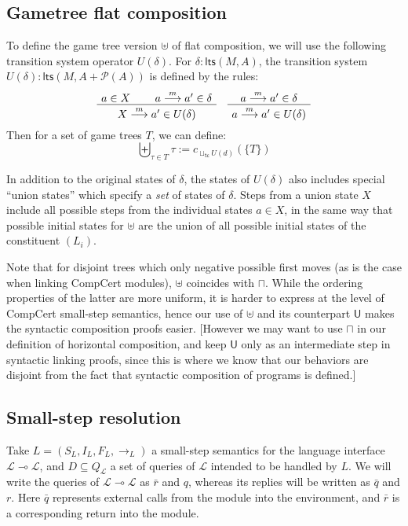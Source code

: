 \documentclass[11pt]{article}
\newcommand{\kw}[1]{{\mathsf{#1}}}
\begin{document}
\subsection{Gametree flat composition}

To define the game tree version $\uplus$ of flat composition,
we will use the following transition system operator $U(\delta)$.
For $\delta : \kw{lts}(M, A)$,
the transition system $U(\delta) : \kw{lts}(M, A + \mathcal{P}(A))$
is defined by the rules:
\[
  \AxiomC{$a \in X$}
  \AxiomC{$a \stackrel{m}{\longrightarrow} a' \in \delta$}
  \BinaryInfC{$X \stackrel{m}{\longrightarrow} a' \in U(\delta)$}
  \DisplayProof
  \quad
  \AxiomC{$a \stackrel{m}{\longrightarrow} a' \in \delta$}
  \UnaryInfC{$a \stackrel{m}{\longrightarrow} a' \in U(\delta)$}
  \DisplayProof
\]
Then for a set of game trees $T$,
we can define:
\[
  \biguplus_{\tau \in T} \tau := c_{\sqcup_\kw{tc} U(d)}(\{ T \})
\]

In addition to the original states of $\delta$,
the states of $U(\delta)$ also includes special ``union states''
which specify a \emph{set} of states of $\delta$.
Steps from a union state $X$ include all possible steps
from the individual states $a \in X$,
in the same way that possible initial states for $\uplus$
are the union of all possible initial states of the constituent $(L_i)$.

Note that for disjoint trees which only negative possible first moves
(as is the case when linking CompCert modules),
$\uplus$ coincides with $\sqcap$.
While the ordering properties of the latter
are more uniform,
it is harder to express at the level of CompCert small-step semantics,
hence our use of $\uplus$ and its counterpart $\kw{U}$
makes the syntactic composition proofs easier.
[However we may want to use $\sqcap$
in our definition of horizontal composition,
and keep $\kw{U}$ only as an intermediate step
in syntactic linking proofs,
since this is where we know that our behaviors are disjoint
from the fact that syntactic composition of programs is defined.]

\subsection{Small-step resolution}

Take $L = (S_L, I_L, F_L, {\rightarrow_L})$ a small-step semantics
for the language interface $\mathcal{L} \multimap \mathcal{L}$,
and $D \subseteq Q_\mathcal{L}$ a set of queries of $\mathcal{L}$
intended to be handled by $L$.
We will write the queries of $\mathcal{L} \multimap \mathcal{L}$
as $\bar{r}$ and $q$,
whereas its replies will be written
as $\bar{q}$ and $r$.
Here $\bar{q}$ represents external calls from the module into the environment,
and $\bar{r}$ is a corresponding return into the module.
\end{document}
